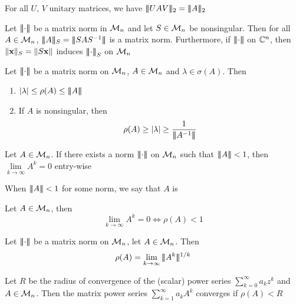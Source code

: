 \documentclass[aspectratio=169]{beamer}
\begin{document}
\begin{frame}
\begin{proposition}
For all $U,\, V$ unitary matrices, we have $\tripbar UAV\tripbar_2= \tripbar A\tripbar_2$
\end{proposition}
\vfill
\begin{theorem}
Let $\left|\!\left|\!\left|\cdot\right|\!\right|\!\right|$ be a matrix norm in $\mathcal{M}_n$ and let $S\in \mathcal{M}_n$ be nonsingular. 
Then for all $A\in \mathcal{M}_n$, $\tripbar A\tripbar_S= \tripbar SAS^{-1}\tripbar$ is a matrix norm. 
Furthermore, if $\left|\!\left|\!\left|\cdot\right|\!\right|\!\right|$ on $\mathbb{C}^n$, then $\|\mathbf{x}\|_S= \|S\mathbf{x}\|$ induces $\left|\!\left|\!\left|\cdot\right|\!\right|\!\right|_S$ on $\mathcal{M}_n$
\end{theorem}
\vfill
\begin{theorem}
Let $\left|\!\left|\!\left|\cdot\right|\!\right|\!\right|$ be a matrix norm on $\mathcal{M}_n$, $A\in \mathcal{M}_n$ and $\lambda\in \sigma(A)$. 
Then 
\begin{enumerate}
    \item $|\lambda |\leq \rho(A) \leq |\! |\! | A|\! |\! |$
    \item If $A$ is nonsingular, then 
    \[
        \rho(A)\geq |\lambda |\geq \dfrac{1}{|\! |\! | A^{-1} |\! |\! |}
    \]
\end{enumerate}
\end{theorem}
\end{frame}



\begin{frame}
\begin{lemma}
Let $A\in \mathcal{M}_n$. If there exists a norm $\left|\!\left|\!\left|\cdot\right|\!\right|\!\right|$ on $\mathcal{M}_n$ such that $|\! |\! | A|\! |\! |< 1$, then $\lim\limits_{k \to \infty}A^k=0$ entry-wise
\end{lemma}
\vfill
\begin{remark}
 When $|\! |\! | A|\! |\! | <1$ for some norm, we say that $A$ is 
\end{remark}
\vfill
\begin{theorem}
Let $A\in \mathcal{M}_n$, then 
\[
    \lim\limits_{k \to \infty} A^k=0 \iff \rho(A)<1
\]
\end{theorem}
\end{frame}



\begin{frame}
\begin{theorem} 
    Let $\left|\!\left|\!\left|\cdot\right|\!\right|\!\right|$ be a matrix norm on $\mathcal{M}_n$, let $A\in \mathcal{M}_n$. Then 
    \[
        \rho(A)= \lim\limits_{k \to \infty} |\! |\! | A^k |\! |\! |^{1/k}
    \]
\end{theorem}
\vfill
\begin{theorem}
 Let $R$ be the radius of convergence of the (scalar) power series $\sum\limits_{k=0}^{\infty} a_kz^k$ and $A\in \mathcal{M}_n$. 
 Then the matrix power series $\sum\limits_{k=1}^{\infty} a_k A^k$ converges if $\rho(A)<R$
\end{theorem}
\end{frame}
\end{document}
